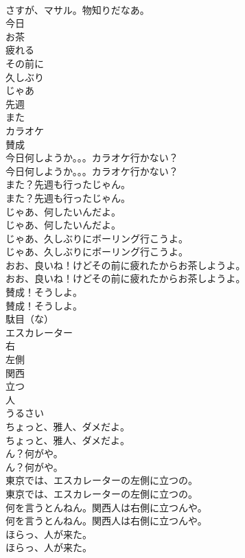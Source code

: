 \documentclass[8pt]{extreport}
\begin{document}
\begin{CJK}{UTF8}{min}
\\	さすが、マサル。物知りだなあ。 
\\	今日
\\	お茶
\\	疲れる
\\	その前に
\\	久しぶり
\\	じゃあ
\\	先週
\\	また
\\	カラオケ
\\	賛成
\\	今日何しようか。。。カラオケ行かない？	
\\	今日何しようか。。。カラオケ行かない？ 
\\	また？先週も行ったじゃん。	
\\	また？先週も行ったじゃん。 
\\	じゃあ、何したいんだよ。	
\\	じゃあ、何したいんだよ。 
\\	じゃあ、久しぶりにボーリング行こうよ。	
\\	じゃあ、久しぶりにボーリング行こうよ。 
\\	おお、良いね！けどその前に疲れたからお茶しようよ。	
\\	おお、良いね！けどその前に疲れたからお茶しようよ。 
\\	賛成！そうしよ。	
\\	賛成！そうしよ。 
\\	駄目（な）
\\	エスカレーター
\\	右
\\	左側
\\	関西
\\	立つ
\\	人
\\	うるさい
\\	ちょっと、雅人、ダメだよ。	
\\	ちょっと、雅人、ダメだよ。 
\\	ん？何がや。	
\\	ん？何がや。 
\\	東京では、エスカレーターの左側に立つの。	
\\	東京では、エスカレーターの左側に立つの。 
\\	何を言うとんねん。関西人は右側に立つんや。	
\\	何を言うとんねん。関西人は右側に立つんや。 
\\	ほらっ、人が来た。	
\\	ほらっ、人が来た。 

\end{CJK}
\end{document}
